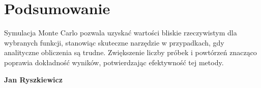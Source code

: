 \documentclass{article}
\begin{document}
\section*{Podsumowanie}

Symulacja Monte Carlo pozwala uzyskać wartości bliskie rzeczywistym dla wybranych funkcji, stanowiąc skuteczne narzędzie w przypadkach, gdy analityczne obliczenia są trudne. Zwiększenie liczby próbek i powtórzeń znacząco poprawia dokładność wyników, potwierdzając efektywność tej metody.
\vspace{1cm} 

\hfill
\textbf{Jan Ryszkiewicz}
\end{document}
